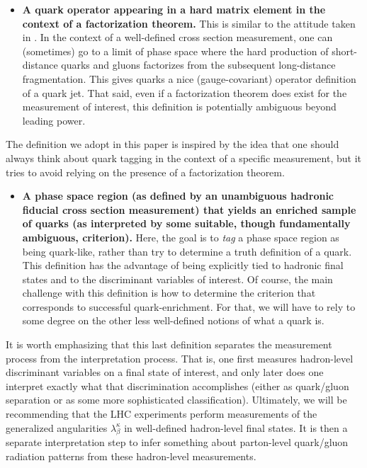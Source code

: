 \documentclass[11pt,letterpaper]{article}
\begin{document}
\begin{itemize}
\item \textbf{A quark operator appearing in a hard matrix element in the context of a factorization theorem.}  This is similar to the attitude taken in \cite{}.  In the context of a well-defined cross section measurement, one can (sometimes) go to a limit of phase space where the hard production of short-distance quarks and gluons factorizes from the subsequent long-distance fragmentation.  This gives quarks a nice (gauge-covariant) operator definition of a quark jet.  That said, even if a factorization theorem does exist for the measurement of interest, this definition is potentially ambiguous beyond leading power.
\end{itemize}
The definition we adopt in this paper is inspired by the idea that one should always think about quark tagging in the context of a specific measurement, but it tries to avoid relying on the presence of a factorization theorem.
\begin{itemize}
\item \textbf{A phase space region (as defined by an unambiguous hadronic fiducial cross section measurement) that yields an enriched sample of quarks (as interpreted by some suitable, though fundamentally ambiguous, criterion).}  Here, the goal is to \emph{tag} a phase space region as being quark-like, rather than try to determine a truth definition of a quark.  This definition has the advantage of being explicitly tied to hadronic final states and to the discriminant variables of interest.   Of course, the main challenge with this definition is how to determine the criterion that corresponds to successful quark-enrichment.  For that, we will have to rely to some degree on the other less well-defined notions of what a quark is.
\end{itemize}  

It is worth emphasizing that this last definition separates the measurement process from the interpretation process.  That is, one first measures hadron-level discriminant variables on a final state of interest, and only later does one interpret exactly what that discrimination accomplishes (either as quark/gluon separation or as some more sophisticated classification).  Ultimately, we will be recommending that the LHC experiments perform measurements of the generalized angularities $\lambda_\beta^\kappa$ in well-defined hadron-level final states.  It is then a separate interpretation step to infer something about parton-level quark/gluon radiation patterns from these hadron-level measurements.
\end{document}
